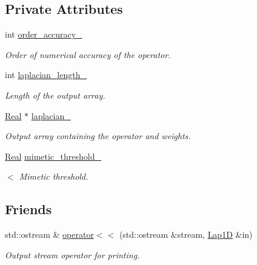 \subsection*{Private Attributes}
\begin{DoxyCompactItemize}
\item 
int \hyperlink{classmtk_1_1Lap1D_a35d34c085b9cf6f9961a699dfb02fea6}{order\+\_\+accuracy\+\_\+}
\begin{DoxyCompactList}\small\item\em Order of numerical accuracy of the operator. \end{DoxyCompactList}\item 
int \hyperlink{classmtk_1_1Lap1D_a05578b0729f2bb4fe8bb442fc555fa80}{laplacian\+\_\+length\+\_\+}
\begin{DoxyCompactList}\small\item\em Length of the output array. \end{DoxyCompactList}\item 
\hyperlink{group__c01-roots_gac080bbbf5cbb5502c9f00405f894857d}{Real} $\ast$ \hyperlink{classmtk_1_1Lap1D_a64a3977527c00b4ef994d1bd549f82fd}{laplacian\+\_\+}
\begin{DoxyCompactList}\small\item\em Output array containing the operator and weights. \end{DoxyCompactList}\item 
\hyperlink{group__c01-roots_gac080bbbf5cbb5502c9f00405f894857d}{Real} \hyperlink{classmtk_1_1Lap1D_a20dce13067774c64dff892323d9c586e}{mimetic\+\_\+threshold\+\_\+}
\begin{DoxyCompactList}\small\item\em $<$ Mimetic threshold. \end{DoxyCompactList}\end{DoxyCompactItemize}
\subsection*{Friends}
\begin{DoxyCompactItemize}
\item 
std\+::ostream \& \hyperlink{classmtk_1_1Lap1D_a235390479381d4e95163674968a1ca7c}{operator$<$$<$} (std\+::ostream \&stream, \hyperlink{classmtk_1_1Lap1D}{Lap1\+D} \&in)
\begin{DoxyCompactList}\small\item\em Output stream operator for printing. \end{DoxyCompactList}\end{DoxyCompactItemize}


